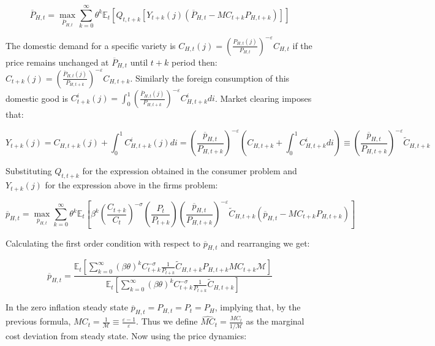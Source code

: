 \documentclass{article}
\newcommand{\Et}{\mathbb{E}_t}
\begin{document}
\begin{equation}
    \overline{P}_{H,t} = \max_{\overline{P}_{H,t}} \sum^\infty_{k=0} \theta^k \Et \left[ Q_{t, t+k}[Y_{t+k}(j) (\overline {P}_{H,t} - MC_{t+k} P_{H,t+k})] \right]
\end{equation}

The domestic demand for a specific variety is $C_{H,t}(j) = \left( \frac{P_{H,t}(j)}{P_{H,t}} \right)^{-\varepsilon} C_{H, t}$ if the price remains unchanged at $\overline {P}_{H,t}$ until $t+k$ period then: $C_{t+k}(j) = \left( \frac{\overline {P}_{H,t}(j)}{P_{H,t+k}}\right)^{-\varepsilon} C_{H, t+k}$. Similarly the foreign consumption of this domestic good is $C^i_{t+k}(j) = \int^1_0 \left( \frac{\overline {P}_{H,t}(j)}{P_{H,t+k}} \right)^{-\varepsilon} C^i_{H, t+k} di$. Market clearing imposes that:

\begin{equation}
    Y_{t+k}(j) = C_{H,t+k}(j) + \int_0^1 C^i_{H, t+k}(j) di = \left( \frac{\overline{p}_{H,t}}{P_{H,t+k}} \right)^{-\varepsilon} \left(C_{H,t+k} +  \int_0^1 C^i_{H, t+k} di \right) \equiv \left( \frac{\overline{p}_{H,t}}{P_{H,t+k}} \right)^{-\varepsilon} \tilde C_{H,t+k}
\end{equation}

Substituting $Q_{t, t+k}$ for the expression obtained in the consumer problem and $Y_{t+k}(j)$ for the expression above in the firms problem:

\begin{equation}
    \overline{p}_{H,t} = \max_{\overline{p}_{H,t}} \sum^\infty_{k=0} \theta^k \Et \left[ \beta^k \left( \frac{C_{t+k}}{C_t} \right)^{-\sigma} \left( \frac{P_{t}}{P_{t+k}} \right) \left( \frac{\overline{p}_{H,t}}{P_{H,t+k}} \right)^{-\varepsilon} \tilde C_{H,t+k} (\overline{p}_{H,t} - MC_{t+k} P_{H,t+k})  \right]
\end{equation}

Calculating the first order condition with respect to $\overline{p}_{H,t}$ and rearranging we get:

\begin{equation}
    \overline{p}_{H,t} =  \frac{\Et\left[ \sum^\infty_{k=0} (\beta\theta)^k C_{t+k}^{-\sigma} \frac{1}{P_{t+k}}\tilde C_{H,t+k} P_{H,t+k} MC_{t+k} \mathcal M \right] }{\Et\left[ \sum^\infty_{k=0} (\beta\theta)^k C_{t+k}^{-\sigma} \frac{1}{P_{t+k}} \tilde C_{H,t+k}  \right]}
\end{equation}

In the zero inflation steady state $\overline{p}_{H,t} = P_{H,t} = P_{t} = P_H$, implying that, by the previous formula, $MC_{t}  = \frac{1}{\mathcal M} \equiv \frac{\varepsilon-1}{\varepsilon}$. Thus we define $\widehat{MC}_t = \frac{MC_t}{1/ \mathcal M}$ as the marginal cost deviation from steady state. Now using the price dynamics:
\end{document}
